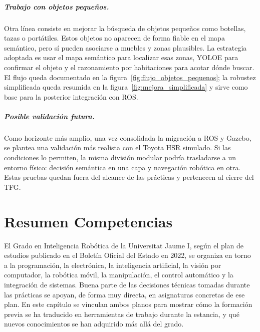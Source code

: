 \documentclass[11pt,fleqn,openany]{book} %
\begin{document}
\paragraph{Trabajo con objetos pequeños.} Otra línea consiste en mejorar la búsqueda de objetos pequeños como botellas, tazas o portátiles. Estos objetos no aparecen de forma fiable en el mapa semántico, pero sí pueden asociarse a muebles y zonas plausibles. La estrategia adoptada es usar el mapa semántico para localizar esas zonas, YOLOE para confirmar el objeto y el razonamiento por habitaciones para acotar dónde buscar. El flujo queda documentado en la figura~\ref{fig:flujo_objetos_pequenos}; la robustez simplificada queda resumida en la figura~\ref{fig:mejora_simplificada} y sirve como base para la posterior integración con ROS.

\paragraph{Posible validación futura.} Como horizonte más amplio, una vez consolidada la migración a ROS y Gazebo, se plantea una validación más realista con el Toyota HSR simulado. Si las condiciones lo permiten, la misma división modular podría trasladarse a un entorno físico: decisión semántica en una capa y navegación robótica en otra. Estas pruebas quedan fuera del alcance de las prácticas y pertenecen al cierre del TFG.



\chapter{Resumen Competencias}\label{chap:competencias}

El Grado en Inteligencia Robótica de la Universitat Jaume I, según el plan de estudios publicado en el Boletín Oficial del Estado en 2022, se organiza en torno a la programación, la electrónica, la inteligencia artificial, la visión por computador, la robótica móvil, la manipulación, el control automático y la integración de sistemas. Buena parte de las decisiones técnicas tomadas durante las prácticas se apoyan, de forma muy directa, en asignaturas concretas de ese plan. En este capítulo se vinculan ambos planos para mostrar cómo la formación previa se ha traducido en herramientas de trabajo durante la estancia, y qué nuevos conocimientos se han adquirido más allá del grado.
\end{document}
